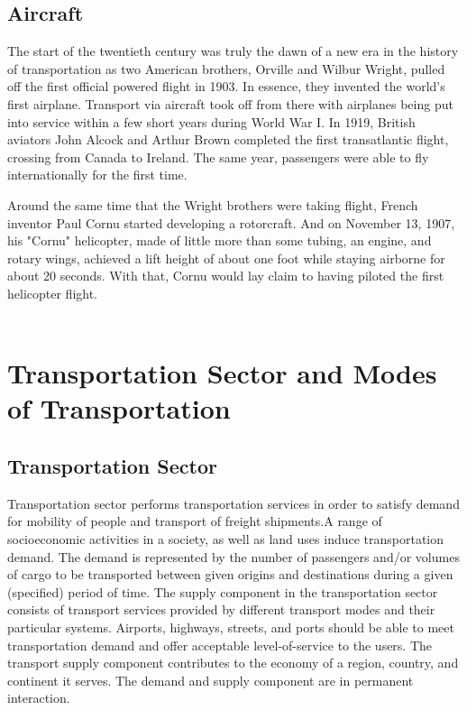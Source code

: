 \subsection*{Aircraft}
\par
The start of the twentieth century was truly the dawn of a new era in the history of transportation as two American brothers, Orville and Wilbur Wright, pulled off the first official powered flight in 1903. In essence, they invented the world’s first airplane. Transport via aircraft took off from there with airplanes being put into service within a few short years during World War I. In 1919, British aviators John Alcock and Arthur Brown completed the first transatlantic flight, crossing from Canada to Ireland. The same year, passengers were able to fly internationally for the first time.
\par
Around the same time that the Wright brothers were taking flight, French inventor Paul Cornu started developing a rotorcraft. And on November 13, 1907, his "Cornu" helicopter, made of little more than some tubing, an engine, and rotary wings, achieved a lift height of about one foot while staying airborne for about 20 seconds. With that, Cornu would lay claim to having piloted the first helicopter flight.
\\\\
\section{Transportation Sector and Modes of Transportation}
\subsection{Transportation Sector}
\par
Transportation sector performs transportation services in order to satisfy demand for mobility of people and transport of freight shipments.A range of socioeconomic activities in a society, as well as land uses induce transportation demand. The demand is represented by the number of passengers and/or volumes of cargo to be transported between given origins and destinations during a given (specified) period of time. The supply component in the transportation sector consists of transport services provided by different transport modes and their particular systems. Airports, highways, streets, and ports should be able to meet transportation demand and offer acceptable level-of-service to the users. The transport supply component contributes to the economy of a region, country, and continent it serves. The demand and supply component are in permanent interaction.
